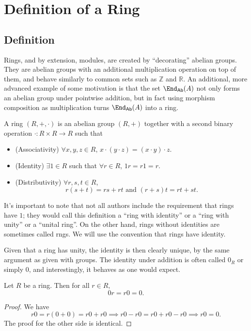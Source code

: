 \section{Definition of a Ring}
\subsection{Definition}
Rings, and by extension, modules, are created by ``decorating'' abelian groups. They are abelian groups with an additional multiplication operation on top of them, and behave similarly to common sets such as $\mathbb{Z}$ and $\mathbb{R}$. An additional, more advanced example of some motivation is that the set $\End_{\mathsf{Ab}}( A ) $ not only forms an abelian group under pointwise addition, but in fact using morphism composition as multiplication turns $\End_{\mathsf{Ab}}( A ) $ into a ring.

\begin{definition}[Ring]\label{dfn:3.1.1}
	A ring $(R,+,\cdot )$ is an abelian group $(R,+)$ together with a second binary operation $\cdot : R\times R \to R$ such that
	\begin{itemize}
		\item (Associativity) $\forall x,y,z\in R$, $x\cdot (y\cdot z)=(x\cdot y)\cdot z$.
		\item (Identity) $\exists 1\in R$ such that $\forall r\in R$, $1r=r1=r$.
		\item (Distributivity) $\forall r,s,t\in R$,
			\[
				r(s+t)=rs+rt\text{ and }(r+s)t=rt+st
			.\]
	\end{itemize}
\end{definition}

It's important to note that not all authors include the requirement that rings have $1$; they would call this definition a ``ring with identity'' or a ``ring with unity'' or a ``unital ring''. On the other hand, rings without identities are sometimes called rngs. We will use the convention that rings have identity.

Given that a ring has unity, the identity is then clearly unique, by the same argument as given with groups. The identity under addition is often called $0_R$ or simply $0$, and interestingly, it behaves as one would expect.
\begin{lemma}\label{lma:3.1.1}
	Let $R$ be a ring. Then for all $r\in R$,
	\[
		0r=r0=0
	.\]
\end{lemma}
\begin{proof}
	We have
	\[
		r0=r(0+0)=r0+r0 \implies r0 - r0 = r0 + r0 - r0 \implies r0 = 0
	.\]
	The proof for the other side is identical.
\end{proof}

